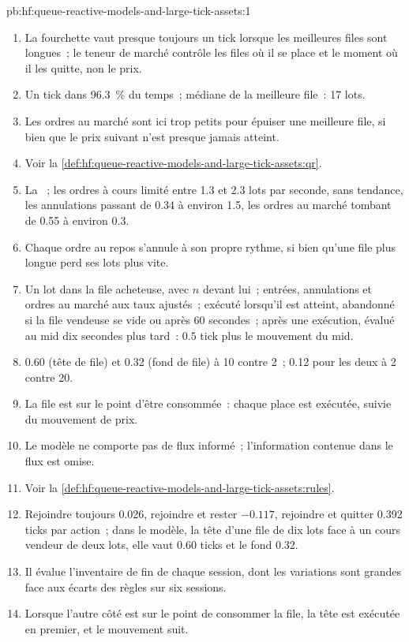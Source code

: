 \begin{solution}{pb:hf:queue-reactive-models-and-large-tick-assets:1}
\begin{enumerate}
\item La fourchette vaut presque toujours un tick lorsque les meilleures files sont longues~; le teneur de marché contrôle les files où il se place et le moment où il les quitte, non le prix.
\item Un tick dans 96.3~\% du temps~; médiane de la meilleure file~: 17 lots.
\item Les ordres au marché sont ici trop petits pour épuiser une meilleure file, si bien que le prix suivant n'est presque jamais atteint.
\item Voir la \cref{def:hf:queue-reactive-models-and-large-tick-assets:qr}.
\item La ~; les ordres à cours limité entre 1.3 et 2.3 lots par seconde, sans tendance, les annulations passant
de 0.34 à environ 1.5, les ordres au marché tombant de 0.55 à environ 0.3.
\item Chaque ordre au repos s'annule à son propre rythme, si bien qu'une file plus longue perd ses lots plus vite.
\item Un lot dans la file acheteuse, avec $n$ devant lui~; entrées, annulations et ordres au marché aux taux ajustés~; exécuté lorsqu'il est atteint, abandonné si la file vendeuse
se vide ou après 60 secondes~; après une exécution, évalué au mid dix secondes plus tard~: $0.5$ tick plus le mouvement du mid.
\item 0.60 (tête de file) et 0.32 (fond de file) à 10 contre 2~; 0.12 pour les deux à 2 contre 20.
\item La file est sur le point d'être consommée~: chaque place est exécutée, suivie du mouvement de prix.
\item Le modèle ne comporte pas de flux informé~; l'information contenue dans le flux est omise.
\item Voir la \cref{def:hf:queue-reactive-models-and-large-tick-assets:rules}.
\item Rejoindre toujours 0.026, rejoindre et rester $-0.117$, rejoindre et quitter 0.392 ticks par action~; dans le modèle, la tête d'une file de dix lots face
à un cours vendeur de deux lots, elle vaut 0.60 ticks et le fond 0.32.
\item Il évalue l'inventaire de fin de chaque session, dont les variations sont grandes face aux écarts des règles sur six sessions.
\item Lorsque l'autre côté est sur le point de consommer la file, la tête est exécutée en premier, et le mouvement suit.

\end{enumerate}
\end{solution}
